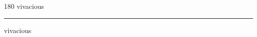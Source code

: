 
\begin{frame}
\begin{center}
\begin{turn}{180}
{\fontsize{2.5cm}{1em}\selectfont vivacious}
\end{turn}
\vspace{1em}\par  
\hrule
\vspace{1em}\par  
{\fontsize{2.5cm}{1em}\selectfont vivacious}
\end{center}
\end{frame}

